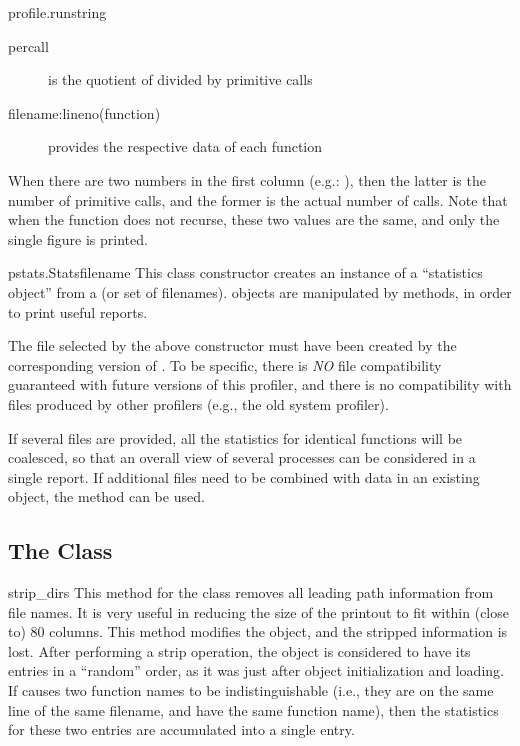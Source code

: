 \begin{funcdesc}{profile.run}{string}
\begin{description}
\item[percall ]
is the quotient of  divided by primitive calls

\item[filename:lineno(function) ]
provides the respective data of each function

\end{description}

When there are two numbers in the first column (e.g.: ),
then the latter is the number of primitive calls, and the former is
the actual number of calls.  Note that when the function does not
recurse, these two values are the same, and only the single figure is
printed.
\end{funcdesc}

\begin{funcdesc}{pstats.Stats}{filename}
This class constructor creates an instance of a ``statistics object''
from a  (or set of filenames).   objects are
manipulated by methods, in order to print useful reports.

The file selected by the above constructor must have been created by
the corresponding version of .  To be specific, there is
\emph{NO} file compatibility guaranteed with future versions of this
profiler, and there is no compatibility with files produced by other
profilers (e.g., the old system profiler).

If several files are provided, all the statistics for identical
functions will be coalesced, so that an overall view of several
processes can be considered in a single report.  If additional files
need to be combined with data in an existing  object, the
 method can be used.
\end{funcdesc}


\subsection{The  Class}

\renewcommand{\indexsubitem}{(Stats method)}

\begin{funcdesc}{strip_dirs}{}
This method for the  class removes all leading path information
from file names.  It is very useful in reducing the size of the
printout to fit within (close to) 80 columns.  This method modifies
the object, and the stripped information is lost.  After performing a
strip operation, the object is considered to have its entries in a
``random'' order, as it was just after object initialization and
loading.  If  causes two function names to be
indistinguishable (i.e., they are on the same line of the same
filename, and have the same function name), then the statistics for
these two entries are accumulated into a single entry.
\end{funcdesc}


